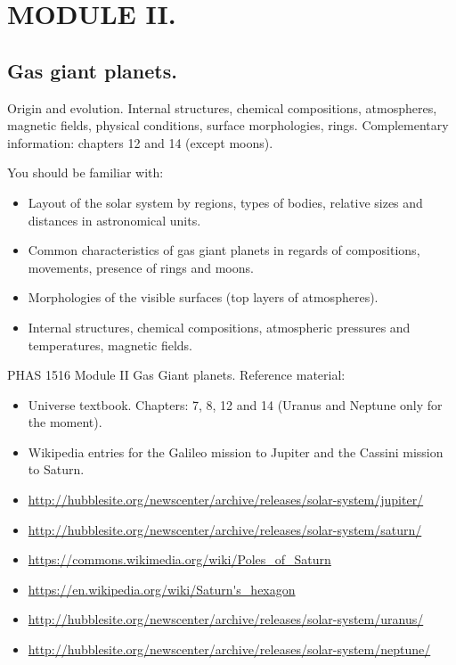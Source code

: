 \section{MODULE II.}
\subsection{Gas giant planets.}

Origin and evolution. Internal structures, chemical compositions, atmospheres, magnetic fields, physical conditions, surface morphologies, rings.
Complementary information: chapters 12 and 14 (except moons).

You should be familiar with:

\begin{itemize}
\item Layout of the solar system by regions, types of bodies, relative sizes and distances in astronomical units.
\item Common characteristics of gas giant planets in regards of compositions, movements, presence of rings and moons.
\item Morphologies of the visible surfaces (top layers of atmospheres).
\item Internal structures, chemical compositions, atmospheric pressures and temperatures, magnetic fields.
\end{itemize}

PHAS 1516 Module II Gas Giant planets. Reference material:

\begin{itemize}
\item Universe textbook. Chapters: 7, 8, 12 and 14 (Uranus and Neptune only for the moment).
\item Wikipedia entries for the Galileo mission to Jupiter and the Cassini mission to Saturn.
\item \url{http://hubblesite.org/newscenter/archive/releases/solar-system/jupiter/}
\item \url{http://hubblesite.org/newscenter/archive/releases/solar-system/saturn/}
\item \url{https://commons.wikimedia.org/wiki/Poles_of_Saturn}
\item \url{https://en.wikipedia.org/wiki/Saturn's_hexagon}
\item \url{http://hubblesite.org/newscenter/archive/releases/solar-system/uranus/}
\item \url{http://hubblesite.org/newscenter/archive/releases/solar-system/neptune/}
\end{itemize}